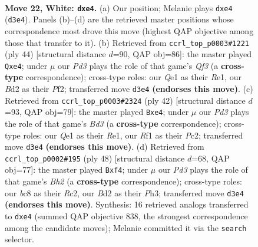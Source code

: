 \documentclass[11pt]{article}
\begin{document}
\clearpage

\begin{figure}[p]\centering
\begin{subfigure}{0.46\textwidth}\centering
\resizebox{\linewidth}{!}{%
\newchessgame
\chessboard[
  setfen={r1b2rk1/5p2/6p1/2pqp2p/4n2P/p1PP2P1/P2B1P2/R3QRK1 w - - 0 22},
  showmover=false,
  pgfstyle=straightmove, color=movearrow, markmove={d3-e4}
]}
\caption{}
\end{subfigure}\hfill
\begin{subfigure}{0.46\textwidth}\centering
\resizebox{\linewidth}{!}{%
\newchessgame
\chessboard[
  setfen={2rrb1k1/2q2pp1/1p2p1p1/pP6/P1P1n3/3B1Q2/5PPP/3RR1K1 w - - 0 23},
  showmover=false,
  pgfstyle=straightmove, color=movearrow, markmove={f3-e4}
]}
\caption{}
\end{subfigure}
\\[4pt]
\begin{subfigure}{0.46\textwidth}\centering
\resizebox{\linewidth}{!}{%
\newchessgame
\chessboard[
  setfen={3r2k1/1p1rppb1/pq5p/4pPp1/4n3/3B1QPP/PPP2P2/1R2R1K1 w - - 0 22},
  showmover=false,
  pgfstyle=straightmove, color=movearrow, markmove={d3-e4}
]}
\caption{}
\end{subfigure}\hfill
\begin{subfigure}{0.46\textwidth}\centering
\resizebox{\linewidth}{!}{%
\newchessgame
\chessboard[
  setfen={r1r3k1/1q2bpp1/1p1p4/p2Pp3/2P2n1p/7P/PPRQB1PB/3R3K w - - 0 25},
  showmover=false,
  pgfstyle=straightmove, color=movearrow, markmove={h2-f4}
]}
\caption{}
\end{subfigure}
\caption{\textbf{Move 22, White: \texttt{dxe4}.} (a) Our position; Melanie plays \texttt{dxe4} (\texttt{d3e4}). Panels (b)--(d) are the retrieved master positions whose correspondence most drove this move (highest QAP objective among those that transfer to it). (b) Retrieved from \texttt{ccrl\_top\_p0003\#1221} (ply 44) [structural distance $d$=90, QAP obj=86]: the master played \texttt{Qxe4}; under $\mu$ our \emph{Pd3} plays the role of that game's \emph{Qf3} (a \textbf{cross-type} correspondence); cross-type roles: our \emph{Q}e1 as their \emph{R}e1, our \emph{B}d2 as their \emph{P}f2; transferred move \texttt{d3e4} \textbf{(endorses this move)}. (c) Retrieved from \texttt{ccrl\_top\_p0003\#2324} (ply 42) [structural distance $d$=93, QAP obj=79]: the master played \texttt{Bxe4}; under $\mu$ our \emph{Pd3} plays the role of that game's \emph{Bd3} (a \textbf{cross-type} correspondence); cross-type roles: our \emph{Q}e1 as their \emph{R}e1, our \emph{R}f1 as their \emph{P}c2; transferred move \texttt{d3e4} \textbf{(endorses this move)}. (d) Retrieved from \texttt{ccrl\_top\_p0002\#195} (ply 48) [structural distance $d$=68, QAP obj=77]: the master played \texttt{Bxf4}; under $\mu$ our \emph{Pd3} plays the role of that game's \emph{Bh2} (a \textbf{cross-type} correspondence); cross-type roles: our \emph{b}c8 as their \emph{R}c2, our \emph{B}d2 as their \emph{P}h3; transferred move \texttt{d3e4} \textbf{(endorses this move)}. Synthesis: 16 retrieved analogs transferred to \texttt{dxe4} (summed QAP objective 838, the strongest correspondence among the candidate moves); Melanie committed it via the \texttt{search} selector.}
\label{fig:thought-m42}
\end{figure}
\end{document}

